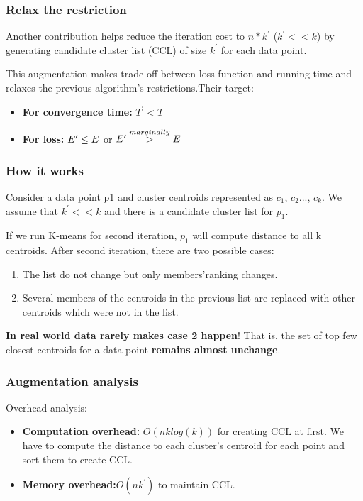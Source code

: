 \documentclass[9pt]{beamer}
\newcommand{\ccp}[1]{{\color{purple}#1}}
\begin{document}
\begin{frame}
	\frametitle{Relax the restriction}
Another contribution helps reduce the iteration cost to $n * k^{\prime}$ ($k^{\prime} << k$) by generating \ccp{candidate cluster list (CCL)} of size $k^{\prime}$ for each data point. \par
This augmentation makes trade-off between loss function and running time and relaxes the previous algorithm's restrictions.Their target:
\begin{itemize}
\item \textbf{For convergence time:} $T^{\prime} < T$
\item \textbf{For loss:} $E^{\prime} \le E \space $ or $ \space E^{\prime} \overset{marginally}{>} E$
\end{itemize}
\end{frame}

\begin{frame}
	\frametitle{How it works}
Consider a data point p1 and cluster centroids represented as $c_1$, $c_2$..., $c_k$. We assume that $k^{\prime} << k $ and there is a candidate cluster list for $p_1$.\par
\pause
 If we run K-means for second iteration, $p_1$ will compute distance to all k centroids. After second iteration, there are two possible cases:
\begin{enumerate}
\item The list do not change but only members'ranking changes.
\item Several members of the centroids in the previous list are replaced with other centroids which were not in the list.
\end{enumerate}
\textbf{In real world data rarely makes case 2 happen}! That is, the set of top few closest centroids for a data point \textbf{remains almost unchange}.
\end{frame}

\begin{frame}
	\frametitle{Augmentation analysis}
Overhead analysis:
\begin{itemize}
\item \textbf{Computation overhead:} $O(nklog(k))$ for creating CCL at first. We have to compute the distance to each cluster's centroid for each point and sort them to create CCL. 
\item \textbf{Memory overhead:}$ O(nk^{\prime})$ to maintain CCL.
\end{itemize}
\end{frame}
\end{document}
